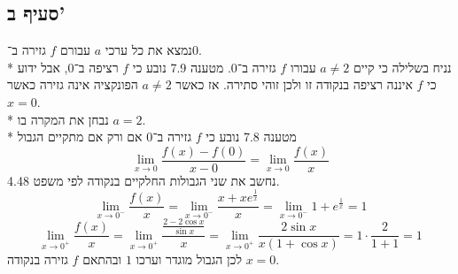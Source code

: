 \subsection{סעיף ב'}
נמצא את כל ערכי $a$ עבורם $f$ גזירה ב־$0$. \\*
נניח בשלילה כי קיים $a \ne 2$ עבורו $f$ גזירה ב־$0$. מטענה 7.9 נובע כי $f$ רציפה ב־$0$, אבל ידוע כי $f$ איננה רציפה בנקודה זו ולכן זוהי סתירה.
אז כאשר $a \ne 2$ הפונקציה אינה גזירה כאשר $x = 0$. \\*
נבחן את המקרה בו $a = 2$. \\*
מטענה 7.8 נובע כי $f$ גזירה ב־$0$ אם ורק אם מתקיים הגבול
\[
	\lim_{x \to 0} \frac{f(x) - f(0)}{x - 0}
	= \lim_{x \to 0} \frac{f(x)}{x}
\]
נחשב את שני הגבולות החלקיים בנקודה לפי משפט 4.48.
\[
	\lim_{x \to 0^-} \frac{f(x)}{x}
	= \lim_{x \to 0^-} \frac{x + xe^{\frac{1}{x}}}{x}
	= \lim_{x \to 0^-} 1 + e^{\frac{1}{x}}
	= 1
\]
\[
	\lim_{x \to 0^+} \frac{f(x)}{x}
	= \lim_{x \to 0^+} \frac{\frac{2 - 2 \cos x}{\sin x}}{x}
	= \lim_{x \to 0^+} \frac{2 \sin x}{x(1 + \cos x)}
	= 1 \cdot \frac{2}{1 + 1} = 1
\]
לכן הגבול מוגדר וערכו $1$ ובהתאם $f$ גזירה בנקודה $x = 0$.

